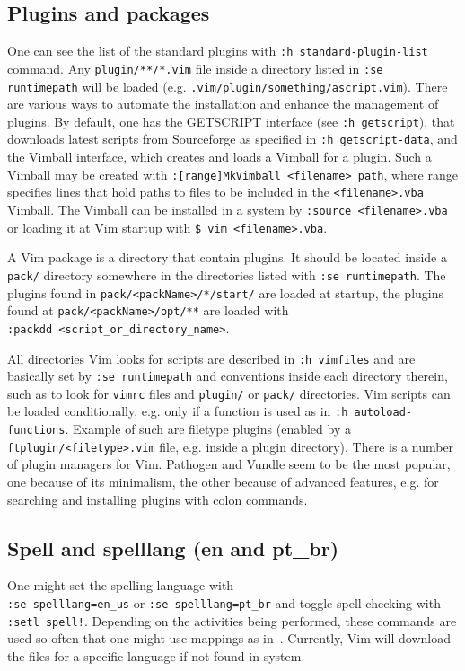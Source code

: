 \documentclass{article}
\newcommand{\tttt}[1]{\texttt{#1}}
\begin{document}
\subsection{Plugins and packages}
One can see the list of the standard plugins
with \tttt{:h standard-plugin-list} command.
Any \tttt{plugin/**/*.vim} file inside a directory
listed in \tttt{:se runtimepath} will be loaded
(e.g. \tttt{.vim/plugin/something/ascript.vim}).
There are various ways to automate the installation
and enhance the management of plugins.
By default, one has the GETSCRIPT interface (see \tttt{:h getscript}),
that downloads latest scripts from Sourceforge as specified in \tttt{:h getscript-data},
and the Vimball interface, which creates and loads a Vimball for a
plugin.
Such a Vimball may be created with \tttt{:[range]MkVimball <filename> path}, where range specifies lines
that hold paths to files to be included in the \tttt{<filename>.vba} Vimball.
The Vimball can be installed in a system by \tttt{:source <filename>.vba}
or loading it at Vim startup with \tttt{\$ vim <filename>.vba}.

A Vim package is a directory that contain plugins.
It should be located inside a \tttt{pack/} directory
somewhere in the directories listed with \tttt{:se runtimepath}.
The plugins found in \tttt{pack/<packName>/*/start/} are loaded
at startup, the plugins found at
\tttt{pack/<packName>/opt/**} are loaded with\\
\tttt{:packdd <script\_or\_directory\_name>}.

All directories Vim looks for scripts are described
in \tttt{:h vimfiles} and are basically set by
\tttt{:se runtimepath} and conventions inside
each directory therein, such as to look for \tttt{vimrc} files
and \tttt{plugin/} or \tttt{pack/} directories.
Vim scripts can be loaded conditionally,
e.g. only if a function is used as in \tttt{:h autoload-functions}.
Example of such are filetype plugins (enabled by a \tttt{ftplugin/<filetype>.vim} file,
e.g. inside a plugin directory).
There is a number of plugin managers for Vim.
Pathogen and Vundle seem to be the most popular,
one because of its minimalism, the other because of
advanced features, e.g. for searching and installing plugins with
colon commands.

\subsection{Spell and spelllang (en and pt\_br)}
One might set the spelling language with\\ \tttt{:se spelllang=en\_us}
or \tttt{:se spelllang=pt\_br}
and toggle spell checking with \tttt{:setl spell!}.
Depending on the activities being performed,
these commands are used so often that one might use mappings as in~\cite{vimrc}.
Currently, Vim will download the files for a specific language if
not found in system.
\end{document}
